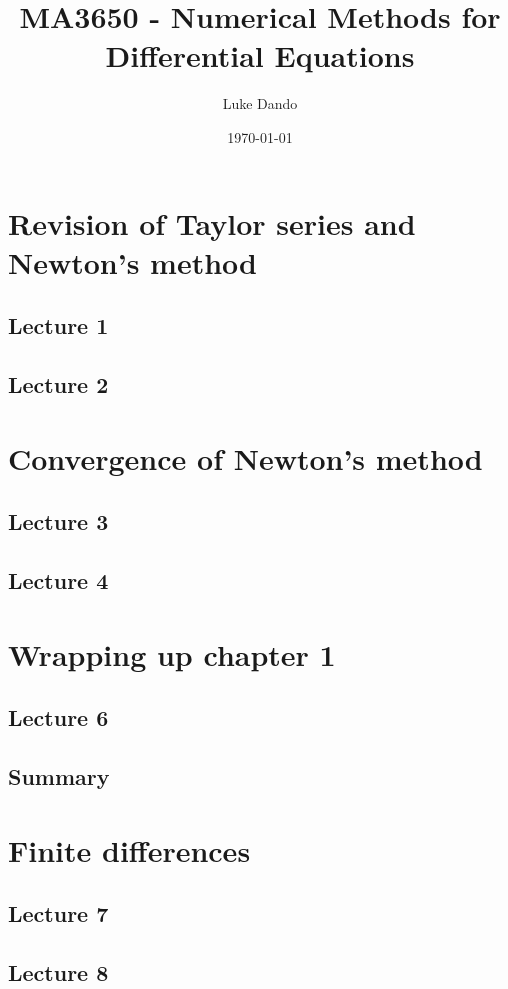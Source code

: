 \documentclass{article}
\title{MA3650 - Numerical Methods for Differential Equations}
\author{Luke Dando}
\date{\today}
\begin{document}
\maketitle

\tableofcontents

\section{Revision of Taylor series and Newton's method}
\subsection{Lecture 1}


\subsection{Lecture 2}


\section{Convergence of Newton's method}
\subsection{Lecture 3}
\subsection{Lecture 4}


\section{Wrapping up chapter 1}
\subsection{Lecture 6}
\subsection{Summary}


\section{Finite differences}
\subsection{Lecture 7}
\subsection{Lecture 8}
\end{document}
